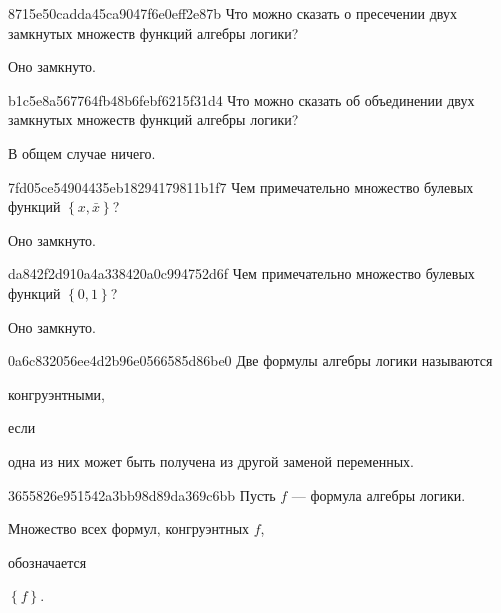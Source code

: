 \begin{note}{8715e50cadda45ca9047f6e0eff2e87b}
    Что можно сказать о пресечении двух замкнутых множеств функций алгебры логики?

    \begin{cloze}{1}
        Оно замкнуто.
    \end{cloze}
\end{note}

\begin{note}{b1c5e8a567764fb48b6febf6215f31d4}
    Что можно сказать об объединении двух замкнутых множеств функций алгебры логики?

    \begin{cloze}{1}
        В общем случае ничего.
    \end{cloze}
\end{note}

\begin{note}{7fd05ce54904435eb18294179811b1f7}
    Чем примечательно множество булевых функций \({ \left\{ x, \bar x \right\} }\)?

    \begin{cloze}{1}
        Оно замкнуто.
    \end{cloze}
\end{note}

\begin{note}{da842f2d910a4a338420a0c994752d6f}
    Чем примечательно множество булевых функций \({ \left\{ 0, 1 \right\} }\)?

    \begin{cloze}{1}
        Оно замкнуто.
    \end{cloze}
\end{note}

\begin{note}{0a6c832056ee4d2b96e0566585d86be0}
    Две формулы алгебры логики называются \begin{icloze}{2}конгруэнтными,\end{icloze} если \begin{icloze}{1}одна из них может быть получена из другой заменой переменных.\end{icloze}
\end{note}

\begin{note}{3655826e951542a3bb98d89da369c6bb}
    Пусть \({ f }\) --- формула алгебры логики.
    \begin{icloze}{2}Множество всех формул, конгруэнтных \({ f }\),\end{icloze} обозначается \begin{icloze}{1}\({ \left\{ f \right\} }\).\end{icloze}
\end{note}

